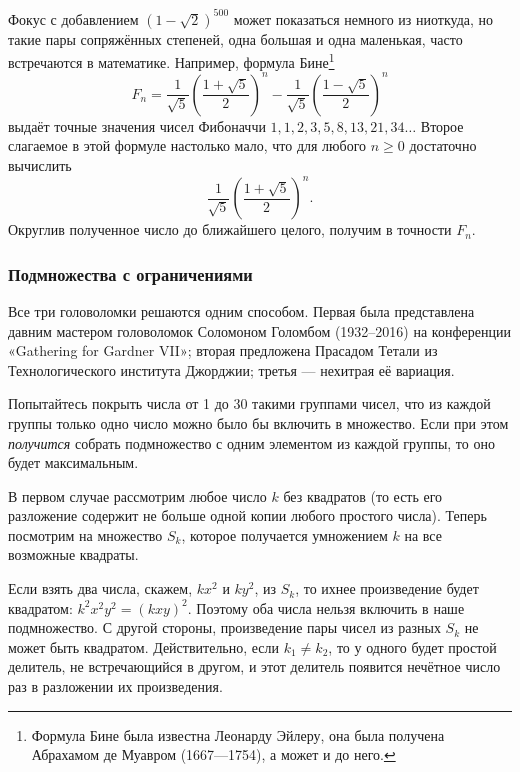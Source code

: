 Фокус с добавлением $(1-\sqrt{2})^{500}$ может показаться немного из ниоткуда, но такие пары сопряжённых степеней, одна большая и одна маленькая, часто встречаются в математике.
Например, формула Бине\footnote{Формула Бине была известна Леонарду Эйлеру, она была получена Абрахамом де Муавром (1667---1754), а может и до него.}
\[F_n=\frac{1}{\sqrt{5}}\left(\frac{1+\sqrt{5}}2\right)^n-\frac{1}{\sqrt{5}}\left(\frac{1-\sqrt{5}}2\right)^n\]
выдаёт точные значения чисел Фибоначчи $1, 1, 2, 3, 5, 8, 13, 21, 34 \dots$
Второе слагаемое в этой формуле настолько мало, что для любого $n \ge 0$ достаточно вычислить
\[\frac{1}{\sqrt{5}}\left(\frac{1+\sqrt{5}}2\right)^n.\]
Округлив полученное число до ближайшего целого, получим в точности $F_n$.

%

\subsubsection*{Подмножества с ограничениями}

Все три головоломки решаются одним способом.
Первая была представлена давним мастером головоломок Соломоном Голомбом (1932--2016) на конференции
«Ga\-the\-ring for Gard\-ner VII»;
вторая предложена Прасадом Тетали из Технологического института Джорджии;
третья --- нехитрая её вариация.

Попытайтесь покрыть числа от 1 до 30 такими группами чисел, что из каждой группы только одно число можно было бы включить в множество.
Если при этом \emph{получится} собрать подмножество с одним элементом из каждой группы, то оно будет максимальным.

В первом случае рассмотрим любое число $k$ без квадратов (то есть его разложение содержит не больше одной копии любого простого числа).
Теперь посмотрим на множество $S_k$, которое получается умножением $k$ на все возможные квадраты.

Если взять два числа, скажем, $kx^2$ и $ky^2$, из $S_k$, то ихнее произведение будет квадратом: $k^2x^2y^2 = (kxy)^2$.
Поэтому оба числа нельзя включить в наше подмножество.
С другой стороны, произведение пары чисел из разных $S_k$ не может быть квадратом.
Действительно, если $k_1\ne k_2$, то у одного будет простой делитель, не встречающийся в другом, и этот делитель появится нечётное число раз в разложении их произведения.

